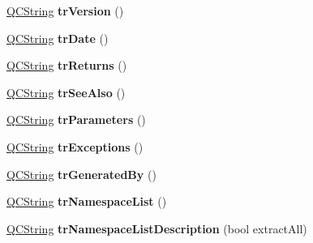 \begin{DoxyCompactItemize}
\item 
\hypertarget{class_translator_croatian_ae87e51832e87155cee39f9446452eea5}{\hyperlink{class_q_c_string}{Q\-C\-String} {\bfseries tr\-Version} ()}\label{class_translator_croatian_ae87e51832e87155cee39f9446452eea5}

\item 
\hypertarget{class_translator_croatian_a8a42054aac49264702e63d0048612a63}{\hyperlink{class_q_c_string}{Q\-C\-String} {\bfseries tr\-Date} ()}\label{class_translator_croatian_a8a42054aac49264702e63d0048612a63}

\item 
\hypertarget{class_translator_croatian_a866a7410912e8a146c122548bcc313d5}{\hyperlink{class_q_c_string}{Q\-C\-String} {\bfseries tr\-Returns} ()}\label{class_translator_croatian_a866a7410912e8a146c122548bcc313d5}

\item 
\hypertarget{class_translator_croatian_ae2a38af2f296dd4c81df824a17ac5024}{\hyperlink{class_q_c_string}{Q\-C\-String} {\bfseries tr\-See\-Also} ()}\label{class_translator_croatian_ae2a38af2f296dd4c81df824a17ac5024}

\item 
\hypertarget{class_translator_croatian_aed4586c549471023ca731d18612fe1d6}{\hyperlink{class_q_c_string}{Q\-C\-String} {\bfseries tr\-Parameters} ()}\label{class_translator_croatian_aed4586c549471023ca731d18612fe1d6}

\item 
\hypertarget{class_translator_croatian_afd184af42e35d6ef611899532f80935c}{\hyperlink{class_q_c_string}{Q\-C\-String} {\bfseries tr\-Exceptions} ()}\label{class_translator_croatian_afd184af42e35d6ef611899532f80935c}

\item 
\hypertarget{class_translator_croatian_a131935c84cc3cc61a5b62f41619cb163}{\hyperlink{class_q_c_string}{Q\-C\-String} {\bfseries tr\-Generated\-By} ()}\label{class_translator_croatian_a131935c84cc3cc61a5b62f41619cb163}

\item 
\hypertarget{class_translator_croatian_a39eed55e25c2d4229943f15d313d3f1f}{\hyperlink{class_q_c_string}{Q\-C\-String} {\bfseries tr\-Namespace\-List} ()}\label{class_translator_croatian_a39eed55e25c2d4229943f15d313d3f1f}

\item 
\hypertarget{class_translator_croatian_a4deddc96cf84bd66a4ffb8174a5d052b}{\hyperlink{class_q_c_string}{Q\-C\-String} {\bfseries tr\-Namespace\-List\-Description} (bool extract\-All)}\label{class_translator_croatian_a4deddc96cf84bd66a4ffb8174a5d052b}


\end{DoxyCompactItemize}
